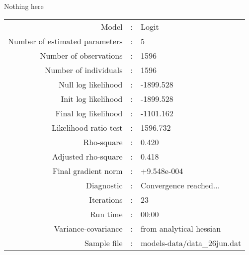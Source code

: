 Nothing here\\


\begin{flushleft}
\begin{tabular}{rcl}
\hline
Model &:& Logit\\
Number of estimated parameters&:&5\\
Number of  observations &:& 1596\\
Number of individuals&:&1596\\
Null log likelihood&:&-1899.528\\
Init log likelihood&:&-1899.528\\
Final log likelihood&:&-1101.162\\
Likelihood ratio test &:&1596.732\\
Rho-square&:&0.420\\
Adjusted rho-square&:&0.418\\
Final gradient norm&:&+9.548e-004\\
Diagnostic&:&Convergence reached...\\
Iterations&:&23\\
Run time&:&00:00\\
Variance-covariance&:&from analytical hessian
\\
Sample file&:&models-data/data_26jun.dat\\
\end{tabular}
\end{flushleft}
